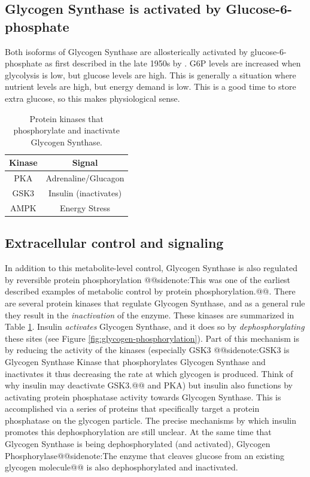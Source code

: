 \documentclass{tufte-handout}
\makeatletter
\def\sidenote#1{@@sidenote:#1@@}
\makeatother
\begin{document}
\subsection{Glycogen Synthase is activated by Glucose-6-phosphate}

Both isoforms of Glycogen Synthase are allosterically activated by glucose-6-phosphate as first described in the late 1950s by \citet{Leloir1959}.  G6P levels are increased when glycolysis is low, but glucose levels are high.  This is generally a situation where nutrient levels are high, but energy demand is low.  This is a good time to store extra glucose, so this makes physiological sense.

\begin{table}
\centering
\caption{Protein kinases that phosphorylate and inactivate Glycogen Synthase.}
\label{tab:gs-sites}
\begin{tabular}{cc}
\hline
\textbf {Kinase} & \textbf{Signal}  \\
\hline
PKA & Adrenaline/Glucagon \\
GSK3 & Insulin (inactivates) \\
AMPK\nomenclature{AMPK}{AMP-Activated Protein Kinase}\index{Regulators!AMPK} & Energy Stress \\
\hline
\end{tabular}
\end{table}

\subsection{Extracellular control and signaling}

In addition to this metabolite-level control, Glycogen Synthase is also regulated by reversible protein phosphorylation \citep{Larner1960}\sidenote{This was one of the earliest described examples of metabolic control by protein phosphorylation.}.  There are several protein kinases that regulate Glycogen Synthase, and as a general rule they result in the \emph{inactivation} of the enzyme.  These kinases are summarized in Table \ref{tab:gs-sites}.  Insulin \emph{activates} Glycogen Synthase, and it does so by \emph{dephosphorylating} these sites (see Figure \ref{fig:glycogen-phosphorylation}).  Part of this mechanism is by reducing the activity of the kinases (especially GSK3 \sidenote{GSK3 is Glycogen Synthase Kinase that phosphorylates Glycogen Synthase and inactivates it thus decreasing the rate at which glycogen is produced. Think of why insulin may deactivate GSK3.} and PKA) but insulin also functions by activating protein phosphatase activity towards Glycogen Synthase.  This is accomplished via a series of proteins that specifically target a protein phosphatase on the glycogen particle.  The precise mechanisms by which insulin promotes this dephosphorylation are still unclear.  At the same time that Glycogen Synthase is being dephosphorylated (and activated), Glycogen Phosphorylase\sidenote{The enzyme that cleaves glucose from an existing glycogen molecule} is also dephosphorylated and inactivated.
\end{document}
